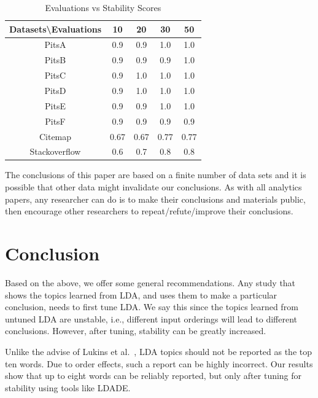 \documentclass[twocolumn,5p,sort&compress]{elsarticle}
\theoremstyle{break}
\begin{document}
\begin{table}[!htbp]
\scriptsize
\begin{center}
\caption{Evaluations vs Stability Scores}
\label{tb:tablename1}
\begin{tabular}{|c|c|c|c|c|}
\hline 
\textbf{Datasets\textbackslash Evaluations} & \textbf{10} & \textbf{20} & \textbf{30} &
\textbf{50} \\[0.5ex]
\hline
PitsA & 0.9 & 0.9 & 1.0 & 1.0\\ 
\hline
PitsB & 0.9 & 0.9 & 0.9 & 1.0 \\
\hline
PitsC & 0.9 & 1.0 & 1.0 & 1.0\\ 
\hline
PitsD & 0.9 & 1.0 & 1.0 & 1.0\\ 
\hline
PitsE & 0.9 & 0.9 & 1.0 & 1.0\\
\hline
PitsF & 0.9 & 0.9 & 0.9 & 0.9\\
\hline
Citemap & 0.67 & 0.67 & 0.77 & 0.77\\
\hline
Stackoverflow & 0.6 & 0.7 & 0.8 & 0.8\\
\hline
\end{tabular}
\end{center}
\end{table}

The conclusions of this paper are based on a finite number of data sets and it is possible
that other data might invalidate our conclusions. As with all analytics papers, any researcher can do is to make their conclusions and materials public, then encourage
other researchers to repeat/refute/improve their conclusions.

\section{Conclusion}

Based on the above, we offer some general recommendations. Any study that shows the topics learned from LDA, and uses them to make a particular
conclusion, needs to first tune LDA. We say this since the topics learned from untuned LDA are unstable, i.e., different input orderings will lead to different conclusions. However, after tuning, stability can be greatly increased.

Unlike the advise of Lukins et al.~\cite{lukins2010bug}, LDA topics should not be reported as the top ten words.
  Due to order effects, such a report can be highly incorrect.
  Our results show that up to eight words can be reliably reported, but only
  after tuning for stability using tools like LDADE.
\end{document}
